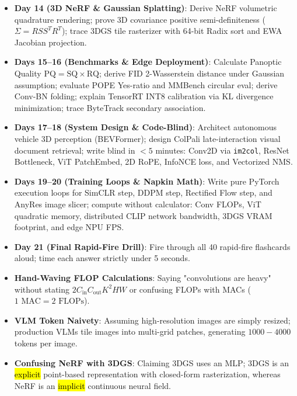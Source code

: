 \begin{itemize}[leftmargin=*,itemsep=0.8pt]
\item \textbf{Day 14 (3D NeRF \& Gaussian Splatting)}: Derive NeRF volumetric quadrature rendering; prove 3D covariance positive semi-definiteness ($\Sigma = R S S^T R^T$); trace 3DGS tile rasterizer with 64-bit Radix sort and EWA Jacobian projection.
\item \textbf{Days 15--16 (Benchmarks \& Edge Deployment)}: Calculate Panoptic Quality $\text{PQ} = \text{SQ} \times \text{RQ}$; derive FID 2-Wasserstein distance under Gaussian assumption; evaluate POPE Yes-ratio and MMBench circular eval; derive Conv-BN folding; explain TensorRT INT8 calibration via KL divergence minimization; trace ByteTrack secondary association.
\item \textbf{Days 17--18 (System Design \& Code-Blind)}: Architect autonomous vehicle 3D perception (BEVFormer); design ColPali late-interaction visual document retrieval; write blind in $<5$ minutes: Conv2D via \texttt{im2col}, ResNet Bottleneck, ViT PatchEmbed, 2D RoPE, InfoNCE loss, and Vectorized NMS.
\item \textbf{Days 19--20 (Training Loops \& Napkin Math)}: Write pure PyTorch execution loops for SimCLR step, DDPM step, Rectified Flow step, and AnyRes image slicer; compute without calculator: Conv FLOPs, ViT quadratic memory, distributed CLIP network bandwidth, 3DGS VRAM footprint, and edge NPU FPS.
\item \textbf{Day 21 (Final Rapid-Fire Drill)}: Fire through all 40 rapid-fire flashcards aloud; time each answer strictly under 5 seconds.
\end{itemize}

\begin{trap}
\begin{itemize}
\item \textbf{Hand-Waving FLOP Calculations}: Saying "convolutions are heavy" without stating $2 C_{\text{in}} C_{\text{out}} K^2 H W$ or confusing FLOPs with MACs ($1\text{ MAC} = 2\text{ FLOPs}$).
\item \textbf{VLM Token Naivety}: Assuming high-resolution images are simply resized; production VLMs tile images into multi-grid patches, generating $1000-4000$ tokens per image.
\item \textbf{Confusing NeRF with 3DGS}: Claiming 3DGS uses an MLP; 3DGS is an \hl{explicit} point-based representation with closed-form rasterization, whereas NeRF is an \hl{implicit} continuous neural field.
\end{itemize}
\end{trap}

